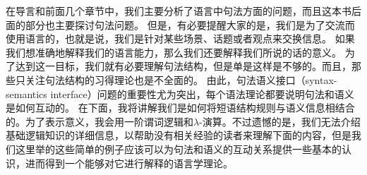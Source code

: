 在导言和前面几个章节中，我们主要分析了语言中句法方面的问题，而且这本书后面的部分也主要探讨句法问题。
但是，有必要提醒大家的是，我们是为了交流而使用语言的，也就是说，我们是针对某些场景、话题或者观点来交换信息。
如果我们想准确地解释我们的语言能力，那么我们还要解释我们所说的话的意义。
为了达到这一目标，我们就有必要理解句法结构，但是单是这样是不够的。而且，那些只关注句法结构的习得理论也是不全面的。
由此，句法语义接口（syntax-semantics interface）问题的重要性尤为突出，每个语法理论都要说明句法和语义是如何互动的。
在下面，我将讲解我们是如何将短语结构规则与语义信息相结合的。为了表示意义，我会用一阶谓词逻辑和$\lambda$-演算。不过遗憾的是，我们无法介绍基础逻辑知识的详细信息，以帮助没有相关经验的读者来理解下面的内容，但是我们这里举的这些简单的例子应该可以为句法和语义的互动关系提供一些基本的认识，进而得到一个能够对它进行解释的语言学理论。

